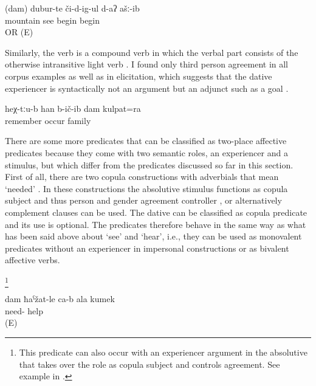 \begin{exe}
	\ex	\label{ex:‎I began to see the mountains2}
	\gll	(dam)	dubur-te	či-d-ig-ul	d-aʔ	ašː-ib\\
			mountain	see	begin	begin\\
	\glt	{} OR  (E)
\end{exe}


Similarly, the verb  is a compound verb in which the verbal part consists of the otherwise intransitive light verb  . I found only third person agreement in all corpus examples as well as in elicitation, which suggests that the dative experiencer is syntactically not an argument but an adjunct such as a goal . 
%
\begin{exe}
	\ex	\label{ex:There I also remembered my family remember}
	\gll	heχ-tːu-b	han	b-ič-ib	dam	kulpat=ra\\
			remember	occur		family\\
	\glt	{}
\end{exe}


There are some more predicates that can be classified as two-place affective predicates because they come with two semantic roles, an experiencer and a stimulus, but which differ from the predicates discussed so far in this section. First of all, there are two copula constructions with adverbials that mean `needed' . In these constructions the absolutive stimulus functions as copula subject and thus person and gender agreement controller , or alternatively complement clauses can be used. The dative can be classified as copula predicate and its use is optional. The predicates therefore behave in the same way as what has been said above about `see' and `hear', i.e., they can be used as monovalent predicates without an experiencer in impersonal constructions or as bivalent affective verbs.

\begin{exe}
	\ex	\label{ex:copula constructions with absolutive stimulus}
	\begin{xlist}
		\ex	{} \footnote{This predicate can also occur with an experiencer argument in the absolutive that takes over the role as copula subject and controls agreement. See example  in .}
		\ex	{} 
	\end{xlist}
	
	
	\ex	\label{ex:I need your help.AFF}
	\gll	dam	ħaˁžat-le	ca-b	ala	kumek\\
			need-			help\\
	\glt	{} (E)
\end{exe}


